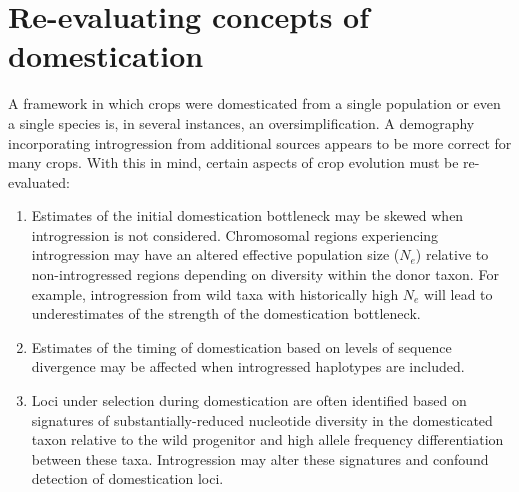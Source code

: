 \documentclass[11pt]{article}
\newcommand{\lwang}[1]{\textcolor{red}{ \emph{\scriptsize  #1}} } %
\newcommand{\gmj}[1]{\textcolor{blue}{ \emph{\scriptsize  #1}} } %
\begin{document}
\section*{Re-evaluating concepts of domestication}
A framework in which crops were domesticated from a single population or even a single species is, in several instances, an oversimplification. A demography incorporating introgression from additional sources appears to be more correct for many crops. With this in mind, certain aspects of crop evolution must be re-evaluated:
\begin{enumerate}
	\item{Estimates of the initial domestication bottleneck may be skewed when introgression is not considered. Chromosomal regions experiencing introgression may have an altered effective population size ($N_e$) relative to non-introgressed regions depending on diversity within the donor taxon.  For example, introgression from wild taxa with historically high $N_e$ will lead to underestimates of the strength of the domestication bottleneck.}%
	\item{Estimates of the timing of domestication based on levels of sequence divergence may be affected when introgressed haplotypes are included.}%
	\item{Loci under selection during domestication are often identified based on signatures of substantially-reduced nucleotide diversity in the domesticated taxon relative to the wild progenitor and high allele frequency differentiation between these taxa. Introgression may alter these signatures and confound detection of domestication loci.} %
\end{enumerate}
\end{document}
